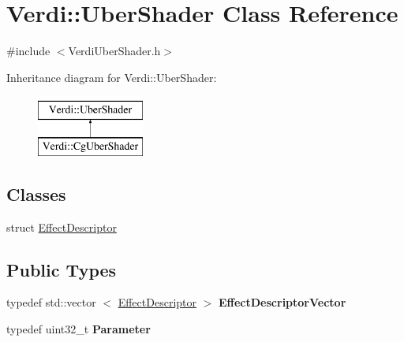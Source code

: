 \hypertarget{class_verdi_1_1_uber_shader}{\section{\-Verdi\-:\-:\-Uber\-Shader \-Class \-Reference}
\label{class_verdi_1_1_uber_shader}
}


{\ttfamily \#include $<$\-Verdi\-Uber\-Shader.\-h$>$}

\-Inheritance diagram for \-Verdi\-:\-:\-Uber\-Shader\-:\begin{figure}[H]
\begin{center}
\leavevmode
\includegraphics[height=2.000000cm]{class_verdi_1_1_uber_shader}
\end{center}
\end{figure}
\subsection*{\-Classes}
\begin{DoxyCompactItemize}
\item 
struct \hyperlink{struct_verdi_1_1_uber_shader_1_1_effect_descriptor}{\-Effect\-Descriptor}
\end{DoxyCompactItemize}
\subsection*{\-Public \-Types}
\begin{DoxyCompactItemize}
\item 
\hypertarget{class_verdi_1_1_uber_shader_a8e70246335388489a88dc52ed21371a6}{typedef std\-::vector\*
$<$ \hyperlink{struct_verdi_1_1_uber_shader_1_1_effect_descriptor}{\-Effect\-Descriptor} $>$ {\bfseries \-Effect\-Descriptor\-Vector}}\label{class_verdi_1_1_uber_shader_a8e70246335388489a88dc52ed21371a6}

\item 
\hypertarget{class_verdi_1_1_uber_shader_a1016c245401f8e2d136f609674aa9c00}{typedef uint32\-\_\-t {\bfseries \-Parameter}}\label{class_verdi_1_1_uber_shader_a1016c245401f8e2d136f609674aa9c00}

\end{DoxyCompactItemize}
